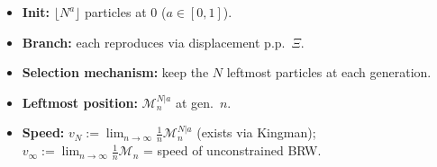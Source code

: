 \begin{itemize}
    \item \textbf{Init:} $\lfloor N^a\rfloor$ particles at $0$ ($a\in[0,1]$).
    \item \textbf{Branch:} each reproduces via displacement p.p.\ $\Xi$.
    \item \textbf{Selection mechanism:} keep the $N$ leftmost particles at each generation.
    \item \textbf{Leftmost position:} $\mathcal M_n^{N|a}$ at gen.\ $n$.
    \item \textbf{Speed:}
    $v_N:=\lim_{n\to\infty}\frac{1}{n}\mathcal M_n^{N|a}$
    (exists via Kingman); \\
    $v_\infty:=\lim_{n\to\infty}\frac{1}{n}\mathcal M_n$ = speed of unconstrained BRW.
\end{itemize}
